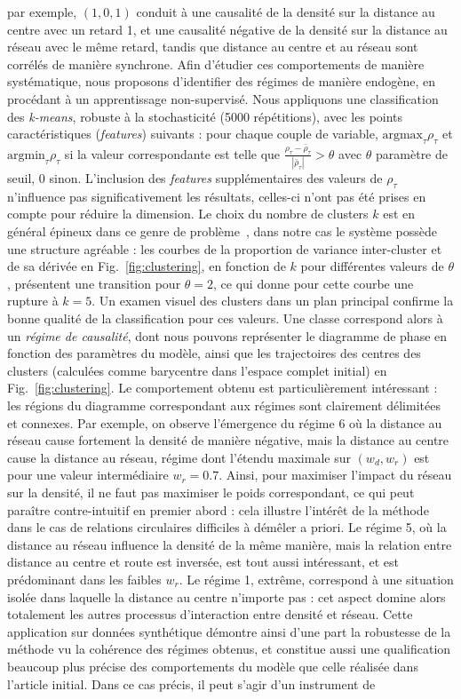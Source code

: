 \documentclass[french]{./sageo}
\begin{document}
par exemple, $(1,0,1)$ conduit à une causalité de la densité sur la distance au centre avec un retard 1, et une causalité négative de la densité sur la distance au réseau avec le même retard, tandis que distance au centre et au réseau sont corrélés de manière synchrone. Afin d'étudier ces comportements de manière systématique, nous proposons d'identifier des régimes de manière endogène, en procédant à un apprentissage non-supervisé. Nous appliquons une classification des \emph{k-means}, robuste à la stochasticité (5000 répétitions), avec les points caractéristiques (\emph{features}) suivants : pour chaque couple de variable, $\textrm{argmax}_{\tau} \rho_{\tau}$ et $\textrm{argmin}_{\tau} \rho_{\tau}$ si la valeur correspondante est telle que $\frac{\rho_{\tau}-\bar{\rho}_{\tau}}{\left|\bar{\rho}_{\tau}\right|} > \theta$ avec $\theta$ paramètre de seuil, 0 sinon. L'inclusion des \emph{features} supplémentaires des valeurs de $\rho_{\tau}$ n'influence pas significativement les résultats, celles-ci n'ont pas été prises en compte pour réduire la dimension. Le choix du nombre de clusters $k$ est en général épineux dans ce genre de problème~\cite{hamerly2003learning}, dans notre cas le système possède une structure agréable : les courbes de la proportion de variance inter-cluster et de sa dérivée en Fig.~\ref{fig:clustering}, en fonction de $k$ pour différentes valeurs de $\theta$, présentent une transition pour $\theta = 2$, ce qui donne pour cette courbe une rupture à $k=5$. Un examen visuel des clusters dans un plan principal confirme la bonne qualité de la classification pour ces valeurs. Une classe correspond alors à un \emph{régime de causalité}, dont nous pouvons représenter le diagramme de phase en fonction des paramètres du modèle, ainsi que les trajectoires des centres des clusters (calculées comme barycentre dans l'espace complet initial) en Fig.~\ref{fig:clustering}. Le comportement obtenu est particulièrement intéressant : les régions du diagramme correspondant aux régimes sont clairement délimitées et connexes. Par exemple, on observe l'émergence du régime 6 où la distance au réseau cause fortement la densité de manière négative, mais la distance au centre cause la distance au réseau, régime dont l'étendu maximale sur $(w_d,w_r)$ est pour une valeur intermédiaire $w_r=0.7$. Ainsi, pour maximiser l'impact du réseau sur la densité, il ne faut pas maximiser le poids correspondant, ce qui peut paraître contre-intuitif en premier abord : cela illustre l'intérêt de la méthode dans le cas de relations circulaires difficiles à démêler a priori. Le régime 5, où la distance au réseau influence la densité de la même manière, mais la relation entre distance au centre et route est inversée, est tout aussi intéressant, et est prédominant dans les faibles $w_r$. Le régime 1, extrême, correspond à une situation isolée dans laquelle la distance au centre n'importe pas : cet aspect domine alors totalement les autres processus d'interaction entre densité et réseau. Cette application sur données synthétique démontre ainsi d'une part la robustesse de la méthode vu la cohérence des régimes obtenus, et constitue aussi une qualification beaucoup plus précise des comportements du modèle que celle réalisée dans l'article initial. Dans ce cas précis, il peut s'agir d'un instrument de 
\end{document}
